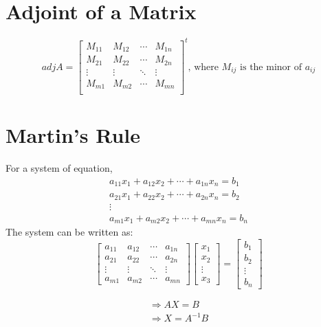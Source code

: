 \section{Adjoint of a Matrix}
\begin{equation}
	adj A=\begin{bmatrix}M_{11}&M_{12}&\cdots&M_{1n}\\ M_{21}&M_{22}&\cdots&M_{2n}\\ \vdots&\vdots&\ddots&\vdots\\M_{m1}&M_{m2}&\cdots&M_{mn}\\ \end{bmatrix}^t\text{, where } M_{ij} \text{ is the minor of } a_{ij}
\end{equation}


\section{Martin's Rule}
For a system of equation,
\begin{align}
	a_{11}x_1+a_{12}x_2+\cdots+a_{1n}x_n=b_1\nonumber\\
	a_{21}x_1+a_{22}x_2+\cdots+a_{2n}x_n=b_2\nonumber\\
	\vdots\nonumber\\
	a_{m1}x_1+a_{m2}x_2+\cdots+a_{mn}x_n=b_n\nonumber
\end{align}
The system can be written as:
\begin{equation}
	\begin{bmatrix}
		a_{11}&a_{12}&\cdots&a_{1n}\\
		a_{21}&a_{22}&\cdots&a_{2n}\\
		\vdots&\vdots&\ddots&\vdots \\
		a_{m1}&a_{m2}&\cdots&a_{mn}
	\end{bmatrix}
	\begin{bmatrix}
		x_1\\
		x_2\\
		\vdots\\
		x_3
	\end{bmatrix}
		=
	\begin{bmatrix}
		b_1\\
		b_2 \\
		\vdots \\
		b_n
	\end{bmatrix}
\end{equation}

\begin{align}
	\Rightarrow AX=B\\
	\Rightarrow X=A^{-1}B
\end{align}
